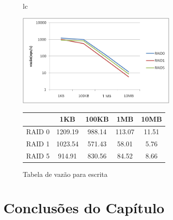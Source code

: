 	\begin{figure}[h]
		\begin{tabular}{lc}
			\begin{minipage}{.50\textwidth}
				\begin{center}
					
					\includegraphics[clip,width=8.0cm]{images/resultados/throughput_escrita.png}
					\caption{Gráfico de vazão para escrita}
					\label{fig:throughput_e}
					
				\end{center}
				
			\end{minipage}
			
			\begin{minipage}{.5\textwidth}
				\makeatletter
				\def\@captype{table}
				\makeatother
				\caption{Tabela de vazão para escrita}
				\label{tab:throughput_e}
				\begin{center}
					\begin{tabular}{|c|c|c|c|c|} \hline
						& 1KB & 100KB & 1MB & 10MB \\ \hline
						
						RAID 0	& 1209.19 & 988.14 & 113.07 & 11.51\\ \hline
						RAID 1	& 1023.54 & 571.43 & 58.01  & 5.76 \\ \hline
						RAID 5	& 914.91  & 830.56 & 84.52  & 8.66 \\ \hline
						
						
					\end{tabular}
				\end{center}
				
			\end{minipage}
		\end{tabular}
	\end{figure}
	
	\section{Conclusões do Capítulo}
	

